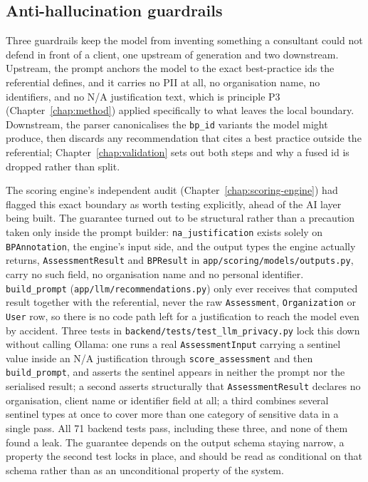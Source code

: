 \subsection{Anti-hallucination guardrails}

Three guardrails keep the model from inventing something a consultant could not defend in front of a client, one upstream of generation and two downstream. Upstream, the prompt anchors the model to the exact best-practice ids the referential defines, and it carries no PII at all, no organisation name, no identifiers, and no N/A justification text, which is principle P3 (Chapter~\ref{chap:method}) applied specifically to what leaves the local boundary. Downstream, the parser canonicalises the \texttt{bp\_\allowbreak id} variants the model might produce, then discards any recommendation that cites a best practice outside the referential; Chapter~\ref{chap:validation} sets out both steps and why a fused id is dropped rather than split.

The scoring engine's independent audit (Chapter~\ref{chap:scoring-engine}) had flagged this exact boundary as worth testing explicitly, ahead of the AI layer being built. The guarantee turned out to be structural rather than a precaution taken only inside the prompt builder: \texttt{na\_\allowbreak justification} exists solely on \texttt{BPAnnotation}, the engine's input side, and the output types the engine actually returns, \texttt{Assessment\allowbreak Result} and \texttt{BPResult} in \texttt{app/\allowbreak scoring/\allowbreak models/\allowbreak outputs.\allowbreak py}, carry no such field, no organisation name and no personal identifier. \texttt{build\_\allowbreak prompt} (\texttt{app/\allowbreak llm/\allowbreak recommendations.\allowbreak py}) only ever receives that computed result together with the referential, never the raw \texttt{Assessment}, \texttt{Organization} or \texttt{User} row, so there is no code path left for a justification to reach the model even by accident. Three tests in \texttt{backend/\allowbreak tests/\allowbreak test\_\allowbreak llm\_\allowbreak privacy.\allowbreak py} lock this down without calling Ollama: one runs a real \texttt{Assessment\allowbreak Input} carrying a sentinel value inside an N/A justification through \texttt{score\_\allowbreak assessment} and then \texttt{build\_\allowbreak prompt}, and asserts the sentinel appears in neither the prompt nor the serialised result; a second asserts structurally that \texttt{Assessment\allowbreak Result} declares no organisation, client name or identifier field at all; a third combines several sentinel types at once to cover more than one category of sensitive data in a single pass. All 71 backend tests pass, including these three, and none of them found a leak. The guarantee depends on the output schema staying narrow, a property the second test locks in place, and should be read as conditional on that schema rather than as an unconditional property of the system.

